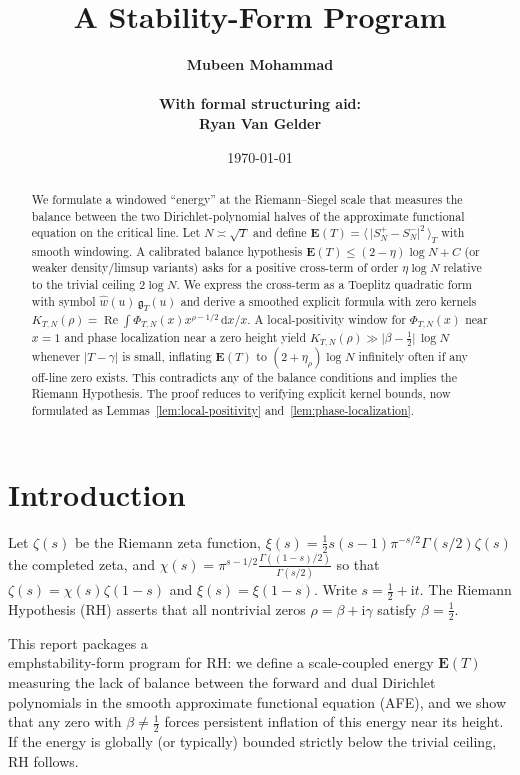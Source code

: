 \documentclass[11pt]{article}
\title{A Stability-Form Program}
\author{\bfseries{Mubeen Mohammad \\ \\ With formal structuring aid:\\ Ryan Van Gelder}}
\date{\today}
\newcommand{\EE}{\mathbf{E}}
\newcommand{\ii}{\mathrm{i}}
\newcommand{\dd}{\mathrm{d}}
\newcommand{\Rea}{\operatorname{Re}}
\newcommand{\zetaR}{\zeta}
\newcommand{\xiR}{\xi}
\newcommand{\chiR}{\chi}
\begin{document}
\maketitle

\begin{abstract}
We formulate a windowed ``energy'' at the Riemann--Siegel scale that measures the balance between the two Dirichlet-polynomial halves of the approximate functional equation on the critical line. Let $N\asymp\sqrt{T}$ and define $\EE(T)=\langle\,\lvert S_N^+ - S_N^-\rvert^2\,\rangle_T$ with smooth windowing. A calibrated balance hypothesis $\EE(T)\le (2-\eta)\log N + C$ (or weaker density/limsup variants) asks for a positive cross-term of order $\eta\log N$ relative to the trivial ceiling $2\log N$. We express the cross-term as a Toeplitz quadratic form with symbol $\widehat{w}(u)\,\mathfrak{g}_T(u)$ and derive a smoothed explicit formula with zero kernels $K_{T,N}(\rho)=\Rea\int \Phi_{T,N}(x)x^{\rho-1/2}\,\dd x/x$. A local-positivity window for $\Phi_{T,N}(x)$ near $x=1$ and phase localization near a zero height yield $K_{T,N}(\rho)\gg \lvert\beta-\tfrac12\rvert\,\log N$ whenever $\lvert T-\gamma\rvert$ is small, inflating $\EE(T)$ to $(2+\eta_\rho)\log N$ infinitely often if any off-line zero exists. This contradicts any of the balance conditions and implies the Riemann Hypothesis. The proof reduces to verifying explicit kernel bounds, now formulated as Lemmas~\ref{lem:local-positivity} and~\ref{lem:phase-localization}.
\end{abstract}

\section{Introduction}
Let $\zetaR(s)$ be the Riemann zeta function, $\xiR(s)=\tfrac12 s(s-1)\pi^{-s/2}\Gamma(s/2)\zetaR(s)$ the completed zeta, and $\chiR(s)=\pi^{s-1/2}\tfrac{\Gamma((1-s)/2)}{\Gamma(s/2)}$ so that $\zetaR(s)=\chiR(s)\zetaR(1-s)$ and $\xiR(s)=\xiR(1-s)$. Write $s=\tfrac12+\ii t$. The Riemann Hypothesis (RH) asserts that all nontrivial zeros $\rho=\beta+\ii\gamma$ satisfy $\beta=\tfrac12$.

This report packages a \\emph{stability-form} program for RH: we define a scale-coupled energy $\EE(T)$ measuring the lack of balance between the forward and dual Dirichlet polynomials in the smooth approximate functional equation (AFE), and we show that any zero with $\beta\neq\tfrac12$ forces persistent inflation of this energy near its height. If the energy is globally (or typically) bounded strictly below the trivial ceiling, RH follows.
\end{document}
